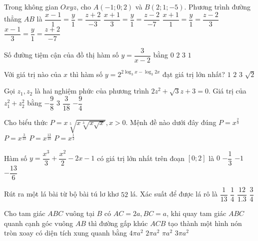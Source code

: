 \begin{ex}%
Trong không gian $Oxyz$, cho $A(-1; 0; 2)$ và $B(2; 1;-5)$. Phương trình đường thẳng $AB$ là
\choice
{$\dfrac{x-1}{1}=\dfrac{y}{1}=\dfrac{z+2}{-3}$}
{\True $\dfrac{x+1}{3}=\dfrac{y}{1}=\dfrac{z-2}{-7}$}
{$\dfrac{x+1}{1}=\dfrac{y}{1}=\dfrac{z-2}{3}$}
{$\dfrac{x-1}{3}=\dfrac{y}{1}=\dfrac{z+2}{-7}$}

\end{ex}
\begin{ex}%
Số đường tiệm cận của đồ thị hàm số $y=\dfrac{3}{x-2}$ bằng
\choice
{$0$}
{\True $2$}
{$3$}
{$1$}

\end{ex}
\begin{ex}%
Với giá trị nào của $x$ thì hàm số $y=2^{2\log_3 x-\log_3 2 x}$ đạt giá trị lớn nhất?
\choice
{$1$}
{$2$}
{\True $3$}
{$\sqrt{2}$}

\end{ex}
\begin{ex}%
Gọi $z_1, z_2$ là hai nghiệm phức của phương trình $2 z^2+\sqrt{3} z+3=0$. Giá trị của $z_1^2+z_2^2$ bằng
\choice
{$-\dfrac{9}{8}$}
{$3$}
{$\dfrac{3}{18}$}
{\True $-\dfrac{9}{4}$}

\end{ex}
\begin{ex}%
Cho biểu thức $P=x \sqrt[5]{x \sqrt[3]{x \sqrt{x}}}, x>0$. Mệnh đề nào dưới đây đúng
\choice
{$P=x^{\frac{2}{3}}$}
{$P=x^{\frac{3}{10}}$}
{\True $P=x^{\frac{13}{10}}$}
{$P=x^{\frac{1}{2}}$}

\end{ex}
\begin{ex}%
Hàm số $y=\dfrac{x^3}{3}+\dfrac{x^2}{2}-2 x-1$ có giá trị lớn nhất trên đoạn $[0; 2]$ là
\choice
{$0$}
{\True $-\dfrac{1}{3}$}
{$-1$}
{$-\dfrac{13}{6}$}

\end{ex}
\begin{ex}%
Rút ra một lá bài từ bộ bài tú lơ khơ $52$ lá. Xác suất để được lá rô là
{$\dfrac{1}{13}$}
{\True  $\dfrac{1}{4}$}
{ $\dfrac{12}{1.3}$}
{ $\dfrac{3}{4}$}

\end{ex}
\begin{ex}%
Cho tam giác $ABC$ vuông tại $B$ có $AC=2 a, BC=a$, khi quay tam giác $ABC$ quanh cạnh góc vuông $AB$ thì đường gấp khúc $ACB$ tạo thành một hình nón tròn xoay có diện tích xung quanh bằng
\choice
{$4\pi a^2$}
{\True $2\pi a^2$}
{$\pi a^2$}
{$3\pi a^2$}

\end{ex}
